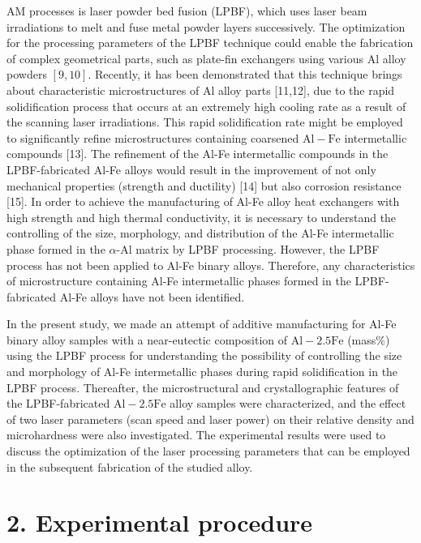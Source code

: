 \documentclass[10pt]{article}
\begin{document}
AM processes is laser powder bed fusion (LPBF), which uses laser beam irradiations to melt and fuse metal powder layers successively. The optimization for the processing parameters of the LPBF technique could enable the fabrication of complex geometrical parts, such as plate-fin exchangers using various $\mathrm{Al}$ alloy powders $[9,10]$. Recently, it has been demonstrated that this technique brings about characteristic microstructures of Al alloy parts [11,12], due to the rapid solidification process that occurs at an extremely high cooling rate as a result of the scanning laser irradiations. This rapid solidification rate might be employed to significantly refine microstructures containing coarsened $\mathrm{Al}-\mathrm{Fe}$ intermetallic compounds [13]. The refinement of the Al-Fe intermetallic compounds in the LPBF-fabricated Al-Fe alloys would result in the improvement of not only mechanical properties (strength and ductility) [14] but also corrosion resistance [15]. In order to achieve the manufacturing of Al-Fe alloy heat exchangers with high strength and high thermal conductivity, it is necessary to understand the controlling of the size, morphology, and distribution of the Al-Fe intermetallic phase formed in the $\alpha$-Al matrix by LPBF processing. However, the LPBF process has not been applied to Al-Fe binary alloys. Therefore, any characteristics of microstructure containing Al-Fe intermetallic phases formed in the LPBF-fabricated Al-Fe alloys have not been identified.

In the present study, we made an attempt of additive manufacturing for Al-Fe binary alloy samples with a near-eutectic composition of $\mathrm{Al}-2.5 \mathrm{Fe}$ (mass\%) using the LPBF process for understanding the possibility of controlling the size and morphology of Al-Fe intermetallic phases during rapid solidification in the LPBF process. Thereafter, the microstructural and crystallographic features of the LPBF-fabricated $\mathrm{Al}-2.5 \mathrm{Fe}$ alloy samples were characterized, and the effect of two laser parameters (scan speed and laser power) on their relative density and microhardness were also investigated. The experimental results were used to discuss the optimization of the laser processing parameters that can be employed in the subsequent fabrication of the studied alloy.

\section*{2. Experimental procedure}
\end{document}
